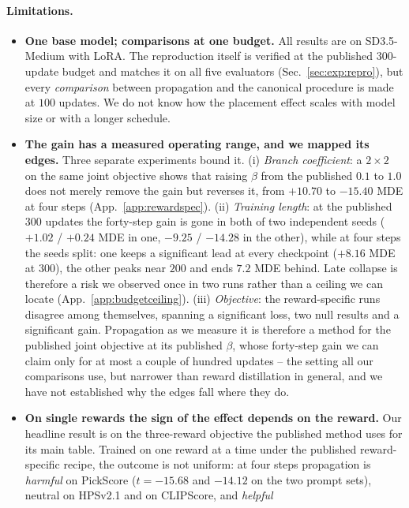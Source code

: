 \paragraph{Limitations.}
\begin{itemize}[leftmargin=1.4em,itemsep=2pt]
\item \textbf{One base model; comparisons at one budget.} All results are on SD3.5-Medium
with LoRA. The reproduction itself is verified at the published $300$-update budget and
matches it on all five evaluators (Sec.~\ref{sec:exp:repro}), but every \emph{comparison}
between propagation and the canonical procedure is made at $100$ updates. We do not know
how the placement effect scales with model size or with a longer schedule.
\item \textbf{The gain has a measured operating range, and we mapped its edges.} Three
separate experiments bound it. (i) \emph{Branch coefficient}: a $2\times2$ on the same joint
objective shows that raising $\beta$ from the published $0.1$ to $1.0$ does not merely
remove the gain but reverses it, from $+10.70$ to $-15.40$ MDE at four steps
(App.~\ref{app:rewardspec}). (ii) \emph{Training length}: at the published $300$ updates the forty-step gain
is gone in both of two independent seeds ($+1.02$ / $+0.24$ MDE in one, $-9.25$ / $-14.28$ in
the other), while at four steps the seeds split: one keeps a significant lead at every
checkpoint ($+8.16$ MDE at $300$), the other peaks near $200$ and ends $7.2$ MDE behind.
Late collapse is therefore a risk we observed once in two runs rather than a ceiling we can
locate (App.~\ref{app:budgetceiling}). (iii) \emph{Objective}: the
reward-specific runs disagree among themselves, spanning a significant loss, two null
results and a significant gain. Propagation as we measure it is
therefore a method for the published joint objective at its published $\beta$, whose
forty-step gain we can claim only for at most a couple of hundred updates -- the setting all our comparisons use, but narrower
than reward distillation in general, and we have not established why the edges fall where
they do.
\item \textbf{On single rewards the sign of the effect depends on the reward.}
Our headline result is on the three-reward objective the published method uses for its main
table. Trained on one reward at a time under the published reward-specific recipe, the
outcome is not uniform: at four steps propagation is \emph{harmful} on PickScore ($t=-15.68$
and $-14.12$ on the two prompt sets), neutral on HPSv2.1 and on CLIPScore, and \emph{helpful}

\end{itemize}
